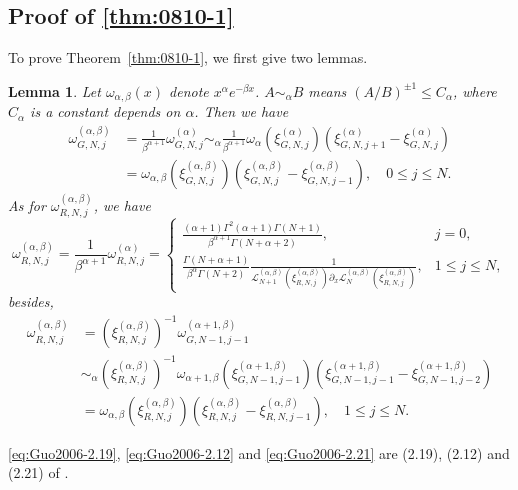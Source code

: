 \documentclass[pdflatex,sn-aps]{sn-jnl}%
\theoremstyle{thmstyleone}%
\newtheorem{lemma}{Lemma}[section]
\theoremstyle{thmstyletwo}%
\theoremstyle{thmstylethree}%
\begin{document}
\begin{appendices}
\section{Proof of \autoref{thm:0810-1}}
\label{appendix:B}
To prove Theorem~\ref{thm:0810-1}, we first give two lemmas.
\begin{lemma}\label{lem:Guo2006-weights}
  Let $\omega_{\alpha,\beta}(x)$ denote $x^\alpha e^{-\beta x}$.
  $A \sim_\alpha B$ means $(A / B)^{ \pm 1} \leqslant C_\alpha$, where $C_\alpha$ is a
  constant depends on $\alpha$. Then we have
  \begin{equation}\label{eq:Guo2006-2.19}
    \begin{aligned}
    \omega_{G, N, j}^{(\alpha, \beta)} & =\frac{1}{\beta^{\alpha+1}} \omega_{G, N, j}^{(\alpha)} \sim_\alpha \frac{1}{\beta^{\alpha+1}} \omega_\alpha\left(\xi_{G, N, j}^{(\alpha)}\right)\left(\xi_{G, N, j+1}^{(\alpha)}-\xi_{G, N, j}^{(\alpha)}\right) \\
    & =\omega_{\alpha, \beta}\left(\xi_{G, N, j}^{(\alpha, \beta)}\right)\left(\xi_{G, N, j}^{(\alpha, \beta)}-\xi_{G, N, j-1}^{(\alpha, \beta)}\right), \quad 0 \leqslant j \leqslant N.
    \end{aligned}
  \end{equation}
  As for $\omega_{R,N,j}^{(\alpha,\beta)}$, we have
  \begin{equation}\label{eq:Guo2006-2.12}
    \omega_{R, N, j}^{(\alpha, \beta)}=\frac{1}{\beta^{\alpha+1}} \omega_{R, N, j}^{(\alpha)}= \begin{cases}\frac{(\alpha+1) \Gamma^2(\alpha+1) \Gamma(N+1)}{\beta^{\alpha+1} \Gamma(N+\alpha+2)}, & j=0, \\ \frac{\Gamma(N+\alpha+1)}{\beta^\alpha \Gamma(N+2)} \frac{1}{\mathcal{L}_{N+1}^{(\alpha, \beta)}\left(\xi_{R, N, j}^{(\alpha, \beta)}\right) \partial_x \mathcal{L}_N^{(\alpha, \beta)}\left(\xi_{R, N, j}^{(\alpha, \beta)}\right)}, & 1 \leqslant j \leqslant N,\end{cases}
  \end{equation}
  besides,
  \begin{equation}\label{eq:Guo2006-2.21}
    \begin{aligned}
    \omega_{R, N, j}^{(\alpha, \beta)} & =\left(\xi_{R, N, j}^{(\alpha, \beta)}\right)^{-1} \omega_{G, N-1, j-1}^{(\alpha+1, \beta)} \\
    & \sim_\alpha \left(\xi_{R, N, j}^{(\alpha, \beta)}\right)^{-1} \omega_{\alpha+1, \beta}\left(\xi_{G, N-1, j-1}^{(\alpha+1, \beta)}\right)\left(\xi_{G, N-1, j-1}^{(\alpha+1, \beta)}-\xi_{G, N-1, j-2}^{(\alpha+1, \beta)}\right) \\
    & =\omega_{\alpha, \beta}\left(\xi_{R, N, j}^{(\alpha, \beta)}\right)\left(\xi_{R, N, j}^{(\alpha, \beta)}-\xi_{R, N, j-1}^{(\alpha, \beta)}\right), \quad 1 \leqslant j \leqslant N .
    \end{aligned}
  \end{equation}
\end{lemma}
\eqref{eq:Guo2006-2.19}, \eqref{eq:Guo2006-2.12} and \eqref{eq:Guo2006-2.21} are
(2.19), (2.12) and (2.21) of \cite{ben2006generalized}.


\end{appendices}
\end{document}
